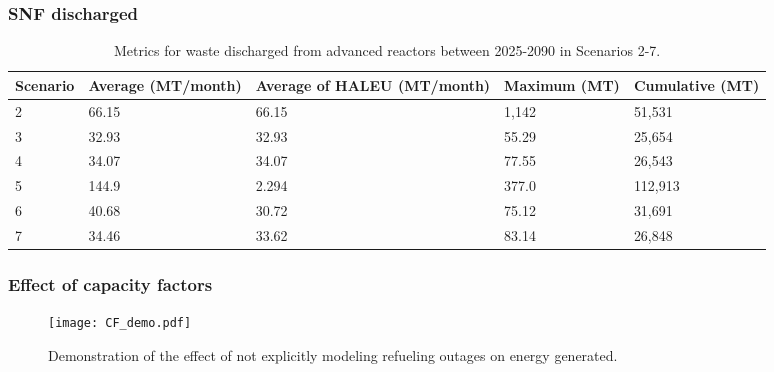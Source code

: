 \begin{frame}
    \frametitle{SNF discharged}
    \begin{table}
        \centering 
        \caption{Metrics for waste discharged from advanced reactors 
        between 2025-2090 in Scenarios 2-7.}
        \label{tab:nogrowth_waste}
        \begin{tabular}{l p{2cm} p{2cm} p{2cm} p{2cm}}
            \hline
            Scenario & Average (MT/month) & Average of \gls{HALEU} 
            (MT/month) & Maximum (MT) & Cumulative (MT)\\\hline
            2 & 66.15 & 66.15 & 1,142 & 51,531\\
            3 & 32.93 & 32.93 & 55.29 & 25,654\\
            4 & 34.07 & 34.07 & 77.55 & 26,543\\
            5 & 144.9 & 2.294 & 377.0 & 112,913\\
            6 & 40.68 & 30.72 & 75.12 & 31,691\\
            7 & 34.46 & 33.62 & 83.14 & 26,848\\
            \hline
        \end{tabular}
    \end{table}

\end{frame}

\begin{frame}
    \frametitle{Effect of capacity factors}
    \begin{figure}
        \texttt{[image: CF\_demo.pdf]}
        \caption{Demonstration of the effect of not explicitly modeling 
        refueling outages on energy generated.}
        \label{fig:CF}
\end{figure}
\end{frame}